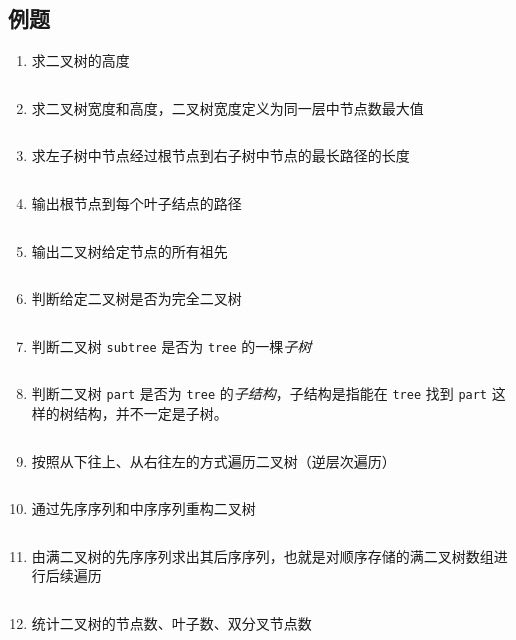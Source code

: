 \documentclass{ctexart}
\begin{document}
\subsection{例题}
\begin{enumerate}
    \item 求二叉树的高度
        \inputminted{c}{codes/height-of-bitree.c}

    \item 求二叉树宽度和高度，二叉树宽度定义为同一层中节点数最大值
        \inputminted{c}{codes/height-and-width-of-bitree.c}

    \item 求左子树中节点经过根节点到右子树中节点的最长路径的长度
        \inputminted{c}{codes/max-distance-through-root.c}

    \item 输出根节点到每个叶子结点的路径
        \inputminted{c}{codes/print-all-traces.c}

    \item 输出二叉树给定节点的所有祖先
        \inputminted{c}{codes/print-ancestors.c}

    \item 判断给定二叉树是否为完全二叉树
        \inputminted{c}{codes/is-complete-bitree.c}

    \item 判断二叉树 \texttt{subtree} 是否为 \texttt{tree} 的一棵\emph{子树}
        \inputminted{c}{codes/is-subtree.c}

    \item 判断二叉树 \texttt{part} 是否为 \texttt{tree} 的\emph{子结构}，子结构是指能在 \texttt{tree} 找到 \texttt{part} 这样的树结构，并不一定是子树。
        \inputminted{c}{codes/is-part-of-bitree.c}

    \item 按照从下往上、从右往左的方式遍历二叉树（逆层次遍历）
        \inputminted{c}{codes/re-level-order.c}

    \item 通过先序序列和中序序列重构二叉树
        \inputminted{c}{codes/rebuild-bitree.c}

    \item 由满二叉树的先序序列求出其后序序列，也就是对顺序存储的满二叉树数组进行后续遍历
        \inputminted{c}{codes/from-preorder-to-postorder.c}

    \item 统计二叉树的节点数、叶子数、双分叉节点数
        \inputminted{c}{codes/statistic-of-bitree.c}


\end{enumerate}
\end{document}
